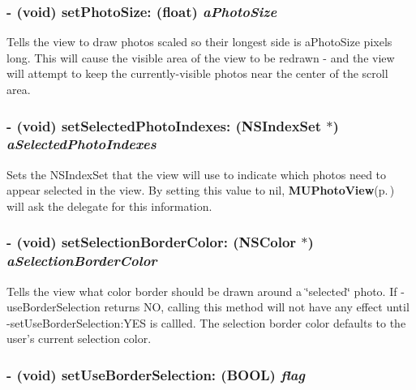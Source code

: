 \subsubsection{\setlength{\rightskip}{0pt plus 5cm}- (void) set\-Photo\-Size: (float) {\em a\-Photo\-Size}}\label{interface_m_u_photo_view_8c44b496107042511a4369253722dae9}


Tells the view to draw photos scaled so their longest side is a\-Photo\-Size pixels long. This will cause the visible area of the view to be redrawn - and the view will attempt to keep the currently-visible photos near the center of the scroll area. 
\subsubsection{\setlength{\rightskip}{0pt plus 5cm}- (void) set\-Selected\-Photo\-Indexes: (NSIndex\-Set $\ast$) {\em a\-Selected\-Photo\-Indexes}}\label{interface_m_u_photo_view_b7bedf237f9e9128af3b015b2042ad7a}


Sets the NSIndex\-Set that the view will use to indicate which photos need to appear selected in the view. By setting this value to nil, {\bf MUPhoto\-View}{\rm (p.\,\pageref{interface_m_u_photo_view})} will ask the delegate for this information. 
\subsubsection{\setlength{\rightskip}{0pt plus 5cm}- (void) set\-Selection\-Border\-Color: (NSColor $\ast$) {\em a\-Selection\-Border\-Color}}\label{interface_m_u_photo_view_be2bf039d1b75e7d9c75cc2093334a1e}


Tells the view what color border should be drawn around a \char`\"{}selected\char`\"{} photo. If -use\-Border\-Selection returns NO, calling this method will not have any effect until -set\-Use\-Border\-Selection:YES is callled. The selection border color defaults to the user's current selection color. 
\subsubsection{\setlength{\rightskip}{0pt plus 5cm}- (void) set\-Use\-Border\-Selection: (BOOL) {\em flag}}\label{interface_m_u_photo_view_6021c0bdb146665f5096e944a80ee908}


